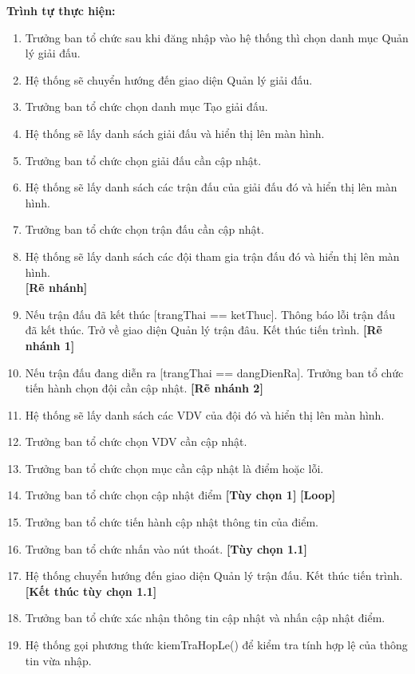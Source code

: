 \noindent
\textbf{Trình tự thực hiện:}
\begin{enumerate}
      \item Trưởng ban tổ chức sau khi đăng nhập vào hệ thống thì chọn danh mục Quản lý giải đấu.
      \item Hệ thống sẽ chuyển hướng đến giao diện Quản lý giải đấu.
      \item Trưởng ban tổ chức chọn danh mục Tạo giải đấu.
      \item Hệ thống sẽ lấy danh sách giải đấu và hiển thị lên màn hình.
      \item Trưởng ban tổ chức chọn giải đấu cần cập nhật.
      \item Hệ thống sẽ lấy danh sách các trận đấu của giải đấu đó và hiển thị lên màn hình.
      \item Trưởng ban tổ chức chọn trận đấu cần cập nhật.
      \item Hệ thống sẽ lấy danh sách các đội tham gia trận đấu đó và hiển thị lên màn hình. \\
            \textbf{[Rẽ nhánh]}
      \item Nếu trận đấu đã kết thúc [trangThai == ketThuc]. Thông báo lỗi trận đấu đã kết thúc. Trở về giao diện Quản lý trận đâu. Kết thúc tiến trình. \textbf{[Rẽ nhánh 1]}
      \item Nếu trận đấu đang diễn ra [trangThai == dangDienRa]. Trưởng ban tổ chức tiến hành chọn đội cần cập nhật. \textbf{[Rẽ nhánh 2]}
      \item Hệ thống sẽ lấy danh sách các VDV của đội đó và hiển thị lên màn hình.
      \item Trưởng ban tổ chức chọn VDV cần cập nhật.
      \item Trưởng ban tổ chức chọn mục cần cập nhật là điểm hoặc lỗi.
      \item Trưởng ban tổ chức chọn cập nhật điểm \textbf{[Tùy chọn 1]}
            \textbf{[Loop]}
      \item Trưởng ban tổ chức tiến hành cập nhật thông tin của điểm.
      \item Trưởng ban tổ chức nhấn vào nút thoát. \textbf{[Tùy chọn 1.1]}
      \item Hệ thống chuyển hướng đến giao diện Quản lý trận đấu. Kết thúc tiến trình.
            \textbf{[Kết thúc tùy chọn 1.1]}
      \item Trưởng ban tổ chức xác nhận thông tin cập nhật và nhấn cập nhật điểm.
      \item Hệ thống gọi phương thức kiemTraHopLe() để kiểm tra tính hợp lệ của thông tin vừa nhập.

\end{enumerate}

